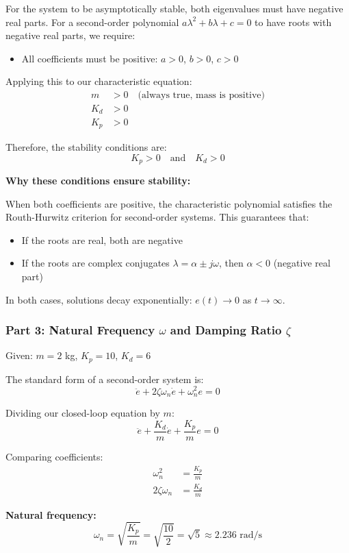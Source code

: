 \documentclass[11pt]{article}
\begin{document}
For the system to be asymptotically stable, both eigenvalues must have negative real parts. For a second-order polynomial $a\lambda^2 + b\lambda + c = 0$ to have roots with negative real parts, we require:
\begin{itemize}
\item All coefficients must be positive: $a > 0$, $b > 0$, $c > 0$
\end{itemize}

Applying this to our characteristic equation:
\begin{align*}
m &> 0 \quad \text{(always true, mass is positive)} \\
K_d &> 0 \\
K_p &> 0
\end{align*}

Therefore, the stability conditions are:
\[
\boxed{K_p > 0 \quad \text{and} \quad K_d > 0}
\]

\textbf{Why these conditions ensure stability:}

When both coefficients are positive, the characteristic polynomial satisfies the Routh-Hurwitz criterion for second-order systems. This guarantees that:
\begin{itemize}
\item If the roots are real, both are negative
\item If the roots are complex conjugates $\lambda = \alpha \pm j\omega$, then $\alpha < 0$ (negative real part)
\end{itemize}

In both cases, solutions decay exponentially: $e(t) \to 0$ as $t \to \infty$.

\subsubsection*{Part 3: Natural Frequency $\omega$ and Damping Ratio $\zeta$}
Given: $m = 2$ kg, $K_p = 10$, $K_d = 6$

The standard form of a second-order system is:
\[
\ddot{e} + 2\zeta\omega_n \dot{e} + \omega_n^2 e = 0
\]

Dividing our closed-loop equation by $m$:
\[
\ddot{e} + \frac{K_d}{m}\dot{e} + \frac{K_p}{m}e = 0
\]

Comparing coefficients:
\begin{align*}
\omega_n^2 &= \frac{K_p}{m} \\
2\zeta\omega_n &= \frac{K_d}{m}
\end{align*}

\textbf{Natural frequency:}
\[
\omega_n = \sqrt{\frac{K_p}{m}} = \sqrt{\frac{10}{2}} = \sqrt{5} \approx 2.236 \text{ rad/s}
\]
\end{document}
